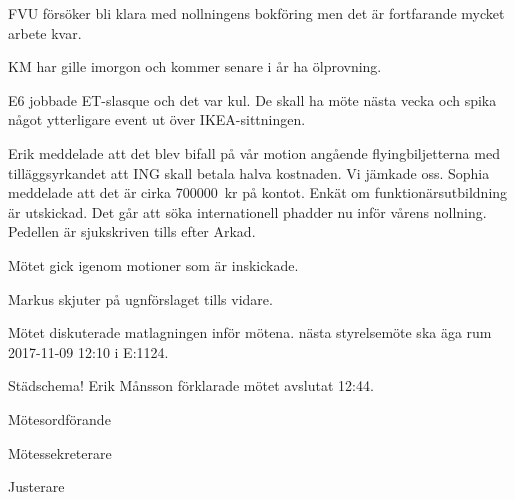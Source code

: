 \documentclass[10pt]{article}
\def\mo{Erik Månsson}
\def\ms{Johan Karlberg}
\def\ji{Daniel Bakic}
\begin{document}
\begin{paragrafer}
\begin{paragrafer}
FVU försöker bli klara med nollningens bokföring men det är fortfarande mycket arbete kvar.

KM har gille imorgon och kommer senare i år ha ölprovning.

E6 jobbade ET-slasque och det var kul. De skall ha möte nästa vecka och spika något ytterligare event ut över IKEA-sittningen.

Erik meddelade att det blev bifall på vår motion angående flyingbiljetterna med tilläggsyrkandet att ING skall betala halva kostnaden. Vi jämkade oss.
Sophia meddelade att det är cirka \SI{700000}{kr} på kontot.
Enkät om funktionärsutbildning är utskickad. Det går att söka internationell phadder nu inför vårens nollning. Pedellen är sjukskriven tills efter Arkad.
\end{paragrafer}

Mötet gick igenom motioner som är inskickade.

Markus skjuter på ugnförslaget tills vidare.

Mötet diskuterade matlagningen inför mötena.
{\Mba} nästa styrelsemöte ska äga rum 2017-11-09 12:10 i E:1124.

{\Ibfu}

Städschema!
{\mo} förklarade mötet avslutat 12:44.

\end{paragrafer}

\hidesignfoot
\begin{signatures}{3}
\signature{\mo}{Mötesordförande}
\signature{\ms}{Mötessekreterare}
\signature{\ji}{Justerare}
\end{signatures}
\end{document}
